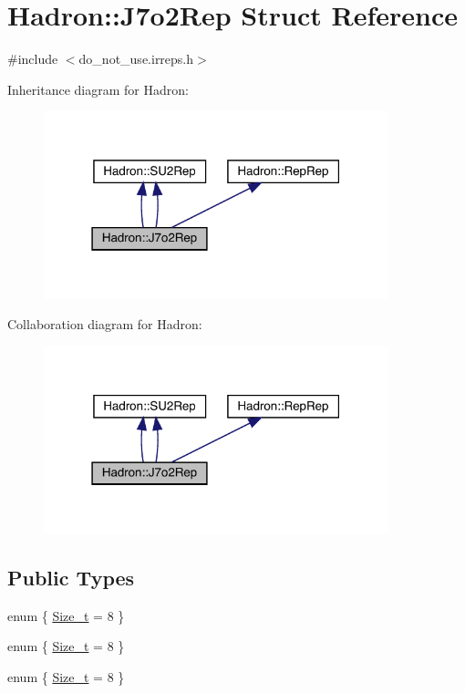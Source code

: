 \hypertarget{structHadron_1_1J7o2Rep}{}\section{Hadron\+:\+:J7o2\+Rep Struct Reference}
\label{structHadron_1_1J7o2Rep}


{\ttfamily \#include $<$do\+\_\+not\+\_\+use.\+irreps.\+h$>$}



Inheritance diagram for Hadron\+:\nopagebreak
\begin{figure}[H]
\begin{center}
\leavevmode
\includegraphics[width=283pt]{d1/d91/structHadron_1_1J7o2Rep__inherit__graph}
\end{center}
\end{figure}


Collaboration diagram for Hadron\+:\nopagebreak
\begin{figure}[H]
\begin{center}
\leavevmode
\includegraphics[width=283pt]{d6/dd0/structHadron_1_1J7o2Rep__coll__graph}
\end{center}
\end{figure}
\subsection*{Public Types}
\begin{DoxyCompactItemize}
\item 
enum \{ \mbox{\hyperlink{structHadron_1_1J7o2Rep_a4424f431ea7377c107b7eb46d52b240cade6da0350f71a39a43a346c50b6b5cb4}{Size\+\_\+t}} = 8
 \}
\item 
enum \{ \mbox{\hyperlink{structHadron_1_1J7o2Rep_a4424f431ea7377c107b7eb46d52b240cade6da0350f71a39a43a346c50b6b5cb4}{Size\+\_\+t}} = 8
 \}
\item 
enum \{ \mbox{\hyperlink{structHadron_1_1J7o2Rep_a4424f431ea7377c107b7eb46d52b240cade6da0350f71a39a43a346c50b6b5cb4}{Size\+\_\+t}} = 8
 \}
\end{DoxyCompactItemize}
